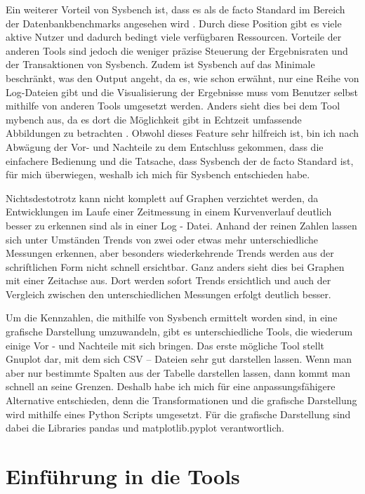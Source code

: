 Ein weiterer Vorteil von Sysbench ist, dass es als de facto Standard im Bereich der Datenbankbenchmarks angesehen wird \cite{mybench_comparison}.
Durch diese Position gibt es viele aktive Nutzer und dadurch bedingt viele verfügbaren Ressourcen.
Vorteile der anderen Tools sind jedoch die weniger präzise Steuerung der Ergebnisraten und der Transaktionen von Sysbench.
Zudem ist Sysbench auf das Minimale beschränkt, was den Output angeht, da es, wie schon erwähnt, nur eine Reihe von Log-Dateien gibt und
die Visualisierung der Ergebnisse muss vom Benutzer selbst mithilfe von anderen Tools umgesetzt werden.
Anders sieht dies bei dem Tool mybench aus, da es dort die Möglichkeit gibt in Echtzeit umfassende Abbildungen zu betrachten \cite{mybench_user_interface}.
Obwohl dieses Feature sehr hilfreich ist, bin ich nach Abwägung der Vor- und Nachteile zu dem Entschluss gekommen, dass die einfachere Bedienung und die Tatsache,
dass Sysbench der de facto Standard ist, für mich überwiegen, weshalb ich mich für Sysbench entschieden habe.

Nichtsdestotrotz kann nicht komplett auf Graphen verzichtet werden, da Entwicklungen im Laufe einer Zeitmessung in einem Kurvenverlauf deutlich besser zu erkennen sind als in einer Log - Datei.
Anhand der reinen Zahlen lassen sich unter Umständen Trends von zwei oder etwas mehr unterschiedliche Messungen erkennen, aber besonders wiederkehrende Trends werden aus der schriftlichen Form nicht schnell ersichtbar.
Ganz anders sieht dies bei Graphen mit einer Zeitachse aus.
Dort werden sofort Trends ersichtlich und auch der Vergleich zwischen den unterschiedlichen Messungen erfolgt deutlich besser.

Um die Kennzahlen, die mithilfe von Sysbench ermittelt worden sind, in eine grafische Darstellung umzuwandeln, gibt es unterschiedliche Tools, die wiederum einige Vor - und Nachteile mit sich bringen.
Das erste mögliche Tool stellt Gnuplot \cite{gnuplot} dar, mit dem sich CSV – Dateien sehr gut darstellen lassen.
Wenn man aber nur bestimmte Spalten aus der Tabelle darstellen lassen, dann kommt man schnell an seine Grenzen.
Deshalb habe ich mich für eine anpassungsfähigere Alternative entschieden, denn die Transformationen und die grafische Darstellung wird mithilfe eines Python Scripts umgesetzt.
Für die grafische Darstellung sind dabei die Libraries pandas \cite{reback2020pandas} und matplotlib.pyplot \cite{hunter_2007} verantwortlich.

\section{Einführung in die Tools}\label{sec:einfuhrung-in-die-tools}

